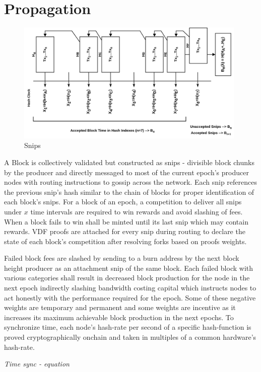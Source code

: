 \documentclass[a4paper,10pt]{article}
\begin{document}
\section{Propagation}
\begin{figure}[H]
\begin{center}
\includegraphics[width=11cm]{Snips}
\caption{Snips}
\end{center}
\end{figure}
A Block is collectively validated but constructed as snips - divisible block chunks by the producer and directly messaged to most of the current epoch's producer nodes with routing instructions to gossip across the network. Each snip references the previous snip's hash similar to the chain of blocks for proper identification of each block's snips. For a block of an epoch, a competition to deliver all snips under $x$ time intervals are required to win rewards and avoid slashing of fees. When a block fails to win shall be minted until its last snip which may contain rewards. VDF proofs are attached for every snip during routing to declare the state of each block's competition after resolving forks based on proofs weights. 

Failed block fees are slashed by sending to a burn address by the next block height producer as an attachment snip of the same block. Each failed block with various categories shall result in decreased block production for the node in the next epoch indirectly slashing bandwidth costing capital which instructs nodes to act honestly with the performance required for the epoch. Some of these negative weights are temporary and permanent and some weights are incentive as it increases its maximum achievable block production in the next epochs. To synchronize time, each node's hash-rate per second of a specific hash-function is proved cryptographically onchain and taken in multiples of a common hardware's hash-rate. 

\textit{Time sync - equation}
\end{document}
